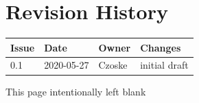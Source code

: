 \documentclass[11pt,oneside,a4paper]{article}
\begin{document}





\clearpage
\pagestyle{fancy}

\section*{Revision History}

\renewcommand{\arraystretch}{1.2}
\begin{tabularx}{\textwidth}{|l|l|l|X|}
  \hline
  \rowcolor{rd1}
  \textbf{Issue}     & \textbf{Date} & \textbf{Owner} & \textbf{Changes}                           \\
  \hline
  0.1                & 2020-05-27    & Czoske         & initial draft                             \\
  \hline
\end{tabularx}


\newpage
\tableofcontents
\clearpage
\listoffigures
\clearpage
\listoftables

\clearpage
\phantom{a}
\vfill
\begin{center}
  This page intentionally left blank
\end{center}
\vfill
\clearpage
\end{document}

